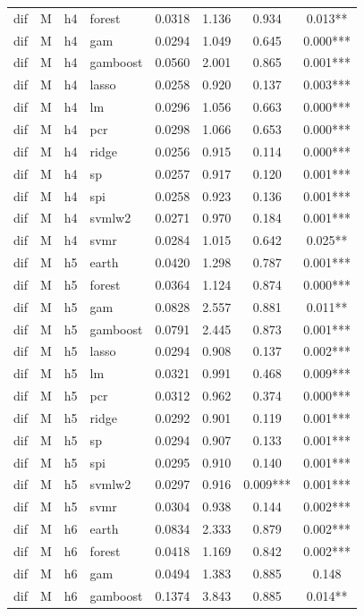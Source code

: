 \begin{ThreePartTable}
\begin{longtable}[t]{llclcccc}
dif & M & h4 & forest & 0.0318 & 1.136 & 0.934 & 0.013**\\
dif & M & h4 & gam & 0.0294 & 1.049 & 0.645 & 0.000***\\
dif & M & h4 & gamboost & 0.0560 & 2.001 & 0.865 & 0.001***\\
dif & M & h4 & lasso & 0.0258 & 0.920 & 0.137 & 0.003***\\
dif & M & h4 & lm & 0.0296 & 1.056 & 0.663 & 0.000***\\
dif & M & h4 & pcr & 0.0298 & 1.066 & 0.653 & 0.000***\\
dif & M & h4 & ridge & 0.0256 & 0.915 & 0.114 & 0.000***\\
dif & M & h4 & sp & 0.0257 & 0.917 & 0.120 & 0.001***\\
dif & M & h4 & spi & 0.0258 & 0.923 & 0.136 & 0.001***\\
dif & M & h4 & svmlw2 & 0.0271 & 0.970 & 0.184 & 0.001***\\
dif & M & h4 & svmr & 0.0284 & 1.015 & 0.642 & 0.025**\\
\addlinespace
dif & M & h5 & earth & 0.0420 & 1.298 & 0.787 & 0.001***\\
dif & M & h5 & forest & 0.0364 & 1.124 & 0.874 & 0.000***\\
dif & M & h5 & gam & 0.0828 & 2.557 & 0.881 & 0.011**\\
dif & M & h5 & gamboost & 0.0791 & 2.445 & 0.873 & 0.001***\\
dif & M & h5 & lasso & 0.0294 & 0.908 & 0.137 & 0.002***\\
dif & M & h5 & lm & 0.0321 & 0.991 & 0.468 & 0.009***\\
dif & M & h5 & pcr & 0.0312 & 0.962 & 0.374 & 0.000***\\
dif & M & h5 & ridge & 0.0292 & 0.901 & 0.119 & 0.001***\\
dif & M & h5 & sp & 0.0294 & 0.907 & 0.133 & 0.001***\\
dif & M & h5 & spi & 0.0295 & 0.910 & 0.140 & 0.001***\\
dif & M & h5 & svmlw2 & 0.0297 & 0.916 & 0.009*** & 0.001***\\
dif & M & h5 & svmr & 0.0304 & 0.938 & 0.144 & 0.002***\\
\addlinespace
dif & M & h6 & earth & 0.0834 & 2.333 & 0.879 & 0.002***\\
dif & M & h6 & forest & 0.0418 & 1.169 & 0.842 & 0.002***\\
dif & M & h6 & gam & 0.0494 & 1.383 & 0.885 & 0.148\\
dif & M & h6 & gamboost & 0.1374 & 3.843 & 0.885 & 0.014**\\

\end{longtable}
\end{ThreePartTable}
